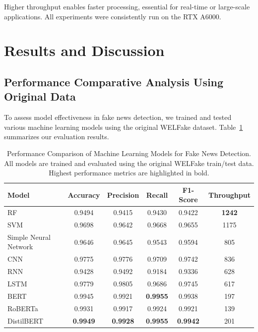 \documentclass[runningheads]{llncs}
\begin{document}
Higher throughput enables faster processing, essential for real-time or large-scale applications. All experiments were consistently run on the RTX A6000.

\section{Results and Discussion}

\subsection{Performance Comparative Analysis Using Original Data}
To assess model effectiveness in fake news detection, we trained and tested various machine learning models using the original WELFake dataset. Table~\ref{tab:model_performance_metrics} summarizes our evaluation results.

\begin{table}[!htbp]
  \centering
  \caption{Performance Comparison of Machine Learning Models for Fake News Detection. All models are trained and evaluated using the original WELFake train/test data. Highest performance metrics are highlighted in bold.}
  \label{tab:model_performance_metrics}
  \begin{tabular}{lccccc}
    \toprule
    \textbf{Model} & \textbf{Accuracy} & \textbf{Precision} & \textbf{Recall} & \textbf{F1-Score} & \textbf{Throughput} \\
    \midrule
    RF & 0.9494 & 0.9415 & 0.9430 & 0.9422 & \textbf{1242} \\
    SVM & 0.9698 & 0.9642 & 0.9668 & 0.9655 & 1175 \\
    Simple Neural Network & 0.9646 & 0.9645 & 0.9543 & 0.9594 & 805 \\
    CNN & 0.9775 & 0.9776 & 0.9709 & 0.9742 & 836 \\
    RNN & 0.9428 & 0.9492 & 0.9184 & 0.9336 & 628 \\
    LSTM & 0.9779 & 0.9805 & 0.9686 & 0.9745 & 617 \\
    BERT & 0.9945 & 0.9921 & \textbf{0.9955} & 0.9938 & 197 \\
    RoBERTa & 0.9931 & 0.9917 & 0.9924 & 0.9921 & 139 \\
    DistilBERT & \textbf{0.9949} & \textbf{0.9928} & \textbf{0.9955} & \textbf{0.9942} & 201 \\
    \bottomrule
  \end{tabular}
\end{table}
\end{document}
